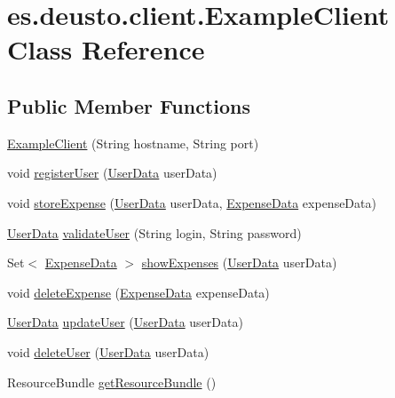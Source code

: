 \hypertarget{classes_1_1deusto_1_1client_1_1_example_client}{}\section{es.\+deusto.\+client.\+Example\+Client Class Reference}
\label{classes_1_1deusto_1_1client_1_1_example_client}
\subsection*{Public Member Functions}
\begin{DoxyCompactItemize}
\item 
\hyperlink{classes_1_1deusto_1_1client_1_1_example_client_afe4bf9d0ff661de1e0ba936df0ce807f}{Example\+Client} (String hostname, String port)
\item 
void \hyperlink{classes_1_1deusto_1_1client_1_1_example_client_a1c17371c17dde2b7664f2ad17ee79e4b}{register\+User} (\hyperlink{classes_1_1deusto_1_1serialization_1_1_user_data}{User\+Data} user\+Data)
\item 
void \hyperlink{classes_1_1deusto_1_1client_1_1_example_client_aba5fe3dfb882ef22d0bd49b5915871d3}{store\+Expense} (\hyperlink{classes_1_1deusto_1_1serialization_1_1_user_data}{User\+Data} user\+Data, \hyperlink{classes_1_1deusto_1_1serialization_1_1_expense_data}{Expense\+Data} expense\+Data)
\item 
\hyperlink{classes_1_1deusto_1_1serialization_1_1_user_data}{User\+Data} \hyperlink{classes_1_1deusto_1_1client_1_1_example_client_a740fa7000d0cd30603ce100b299ba8ba}{validate\+User} (String login, String password)
\item 
Set$<$ \hyperlink{classes_1_1deusto_1_1serialization_1_1_expense_data}{Expense\+Data} $>$ \hyperlink{classes_1_1deusto_1_1client_1_1_example_client_a527d2790290c153cae5b16133a38269a}{show\+Expenses} (\hyperlink{classes_1_1deusto_1_1serialization_1_1_user_data}{User\+Data} user\+Data)
\item 
void \hyperlink{classes_1_1deusto_1_1client_1_1_example_client_a206d3d1f399368f11a36b929af4337d4}{delete\+Expense} (\hyperlink{classes_1_1deusto_1_1serialization_1_1_expense_data}{Expense\+Data} expense\+Data)
\item 
\hyperlink{classes_1_1deusto_1_1serialization_1_1_user_data}{User\+Data} \hyperlink{classes_1_1deusto_1_1client_1_1_example_client_afbee30635a2cfe7fb7cfc58393b40bfb}{update\+User} (\hyperlink{classes_1_1deusto_1_1serialization_1_1_user_data}{User\+Data} user\+Data)
\item 
void \hyperlink{classes_1_1deusto_1_1client_1_1_example_client_a20bd33a8b93e804925b4a8e338413b00}{delete\+User} (\hyperlink{classes_1_1deusto_1_1serialization_1_1_user_data}{User\+Data} user\+Data)
\item 
Resource\+Bundle \hyperlink{classes_1_1deusto_1_1client_1_1_example_client_a85a29c19dfbfcad9d08dcc17d688d8d3}{get\+Resource\+Bundle} ()
\end{DoxyCompactItemize}
